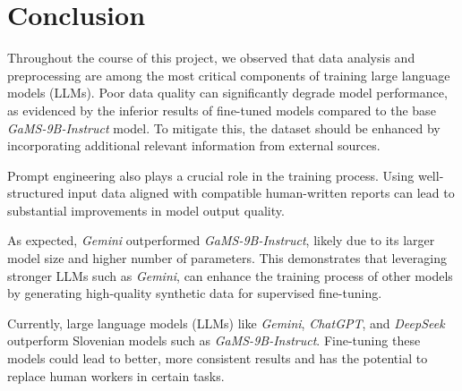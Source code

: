 \documentclass[fleqn,moreauthors,10pt]{ds_report}
\begin{document}
\section*{Conclusion}

Throughout the course of this project, we observed that data analysis and preprocessing are among the most critical components of training large language models (LLMs). Poor data quality can significantly degrade model performance, as evidenced by the inferior results of fine-tuned models compared to the base \textit{GaMS-9B-Instruct} model. To mitigate this, the dataset should be enhanced by incorporating additional relevant information from external sources.

Prompt engineering also plays a crucial role in the training process. Using well-structured input data aligned with compatible human-written reports can lead to substantial improvements in model output quality.

As expected, \textit{Gemini} outperformed \textit{GaMS-9B-Instruct}, likely due to its larger model size and higher number of parameters. This demonstrates that leveraging stronger LLMs such as \textit{Gemini}, can enhance the training process of other models by generating high-quality synthetic data for supervised fine-tuning.

Currently, large language models (LLMs) like \textit{Gemini}, \textit{ChatGPT}, and \textit{DeepSeek} outperform Slovenian models such as \textit{GaMS-9B-Instruct}. Fine-tuning these models could lead to better, more consistent results and has the potential to replace human workers in certain tasks.
\end{document}
